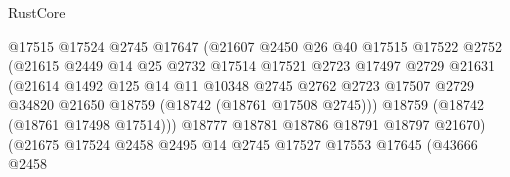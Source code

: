 \begin{lexlean}{RustCore}
\begin{coremodule}
                                    @17515
                                    @17524
                                    @2745
                                    @17647
                                    (@21607
                                      @2450
                                      @26
                                      @40
                                      @17515
                                      @17522
                                      @2752
                                      (@21615
                                        @2449
                                        @14
                                        @25
                                        @2732
                                        @17514
                                        @17521
                                        @2723
                                        @17497
                                        @2729
                                        @21631
                                        (@21614
                                          @1492
                                          @125
                                          @14
                                          @11
                                          @10348
                                          @2745
                                          @2762
                                          @2723
                                          @17507
                                          @2729
                                          @34820
                                          @21650
                                          @18759
                                          (@18742 (@18761 @17508 @2745)))
                                        @18759
                                        (@18742 (@18761 @17498 @17514)))
                                      @18777
                                      @18781
                                      @18786
                                      @18791
                                      @18797
                                      @21670)
                                    (@21675
                                      @17524
                                      @2458
                                      @2495
                                      @14
                                      @2745
                                      @17527
                                      @17553
                                      @17645
                                      (@43666
                                        @2458

\end{coremodule}
\end{lexlean}
